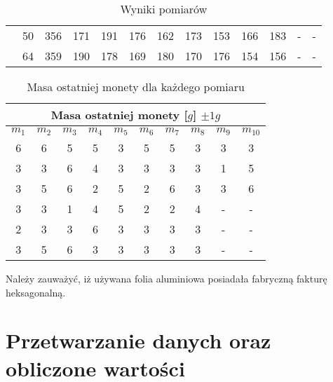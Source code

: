 \documentclass[a4paper,12pt]{article}
\begin{document}
\begin{table}[h]
{\begin{tabular}{|c|c|c|c|c|c|c|c|c|c|c|c|c|}
			                                            & 50                                         & 356                                        & 171                                                      & 191   & 176   & 162   & 173   & 153   & 166   & 183   & -     & -        \\ \cline{2-13}
			                                            & 64                                         & 359                                        & 190                                                      & 178   & 169   & 180   & 170   & 176   & 154   & 156   & -     & -        \\ \hline
		\end{tabular}%
	}
	\centering
	\caption{Wyniki pomiarów}\label{pomiary:raw}
\end{table}

\begin{table}[h]
	\begin{tabular}{|c|c|c|c|c|c|c|c|c|c|}
		\hline
		\multicolumn{10}{|c|}{Masa ostatniej monety {[}$g${]} $\pm 1g$}                  \\ \hline
		$m_1$ & $m_2$ & $m_3$ & $m_4$ & $m_5$ & $m_6$ & $m_7$ & $m_8$ & $m_9$ & $m_{10}$ \\ \hline
		\hline
		6     & 6     & 5     & 5     & 3     & 5     & 5     & 3     & 3     & 3        \\ \hline
		3     & 3     & 6     & 4     & 3     & 3     & 3     & 3     & 1     & 5        \\ \hline
		3     & 5     & 6     & 2     & 5     & 2     & 6     & 3     & 3     & 6        \\ \hline
		\hline
		3     & 3     & 1     & 4     & 5     & 2     & 2     & 4     & -     & -        \\ \hline
		2     & 3     & 3     & 6     & 3     & 3     & 3     & 3     & -     & -        \\ \hline
		3     & 5     & 6     & 3     & 3     & 3     & 3     & 3     & -     & -        \\ \hline
	\end{tabular}
	\centering
	\caption{Masa ostatniej monety dla każdego pomiaru}\label{data:lastOfMonetas}
\end{table}
Należy zauważyć, iż używana folia aluminiowa posiadała fabryczną fakturę heksagonalną.

\section{Przetwarzanie danych oraz obliczone wartości}
\end{document}
